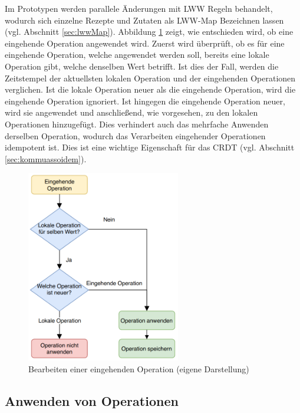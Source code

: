 \documentclass[a4paper, 12pt]{scrreprt}
\begin{document}
Im Prototypen werden parallele Änderungen mit \ac{LWW} Regeln behandelt, wodurch sich einzelne Rezepte und Zutaten als LWW-Map Bezeichnen lassen (vgl. Abschnitt \ref{sec:lwwMap}). Abbildung \ref{fig:flwochartOperationen} zeigt, wie entschieden wird, ob eine eingehende Operation angewendet wird. Zuerst wird überprüft, ob es für eine eingehende Operation, welche angewendet werden soll, bereits eine lokale Operation gibt, welche denselben Wert betrifft. Ist dies der Fall, werden die Zeitstempel der aktuellsten lokalen Operation und der eingehenden Operationen verglichen. Ist die lokale Operation neuer als die eingehende Operation, wird die eingehende Operation ignoriert. Ist hingegen die eingehende Operation neuer, wird sie angewendet und anschließend, wie vorgesehen, zu den lokalen Operationen hinzugefügt. Dies verhindert auch das mehrfache Anwenden derselben Operation, wodurch das Verarbeiten eingehender Operationen idempotent ist. Dies ist eine wichtige Eigenschaft für das CRDT (vgl. Abschnitt \ref{sec:kommuassoidem}). 

\begin{figure}[H]
	\centering
	\includegraphics[width=0.6\textwidth]{flowchartOperationen.png}
	\caption[Bearbeiten einer eingehenden Operation]{Bearbeiten einer eingehenden Operation (eigene Darstellung)}
	\label{fig:flwochartOperationen}
\end{figure}

\subsection{Anwenden von Operationen}
\label{sec:anwendenOperationen}
\end{document}
